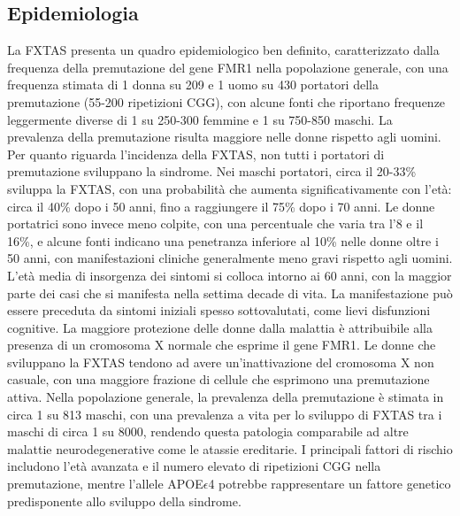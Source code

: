 \subsection{Epidemiologia}
La FXTAS presenta un quadro epidemiologico ben definito, caratterizzato dalla frequenza della premutazione del gene FMR1 nella popolazione generale, con una frequenza stimata di 1 donna su 209 e 1 uomo su 430 portatori della premutazione (55-200 ripetizioni CGG), con alcune fonti che riportano frequenze leggermente diverse di 1 su 250-300 femmine e 1 su 750-850 maschi. La prevalenza della premutazione risulta maggiore nelle donne rispetto agli uomini.
Per quanto riguarda l'incidenza della FXTAS, non tutti i portatori di premutazione sviluppano la sindrome. Nei maschi portatori, circa il 20-33\% sviluppa la FXTAS, con una probabilità che aumenta significativamente con l'età: circa il 40\% dopo i 50 anni, fino a raggiungere il 75\% dopo i 70 anni. Le donne portatrici sono invece meno colpite, con una percentuale che varia tra l'8 e il 16\%, e alcune fonti indicano una penetranza inferiore al 10\% nelle donne oltre i 50 anni, con manifestazioni cliniche generalmente meno gravi rispetto agli uomini.
L'età media di insorgenza dei sintomi si colloca intorno ai 60 anni, con la maggior parte dei casi che si manifesta nella settima decade di vita. La manifestazione può essere preceduta da sintomi iniziali spesso sottovalutati, come lievi disfunzioni cognitive. La maggiore protezione delle donne dalla malattia è attribuibile alla presenza di un cromosoma X normale che esprime il gene FMR1. Le donne che sviluppano la FXTAS tendono ad avere un'inattivazione del cromosoma X non casuale, con una maggiore frazione di cellule che esprimono una premutazione attiva.
Nella popolazione generale, la prevalenza della premutazione è stimata in circa 1 su 813 maschi, con una prevalenza a vita per lo sviluppo di FXTAS tra i maschi di circa 1 su 8000, rendendo questa patologia comparabile ad altre malattie neurodegenerative come le atassie ereditarie. I principali fattori di rischio includono l'età avanzata e il numero elevato di ripetizioni CGG nella premutazione, mentre l'allele APOE$\epsilon$4 potrebbe rappresentare un fattore genetico predisponente allo sviluppo della sindrome.

